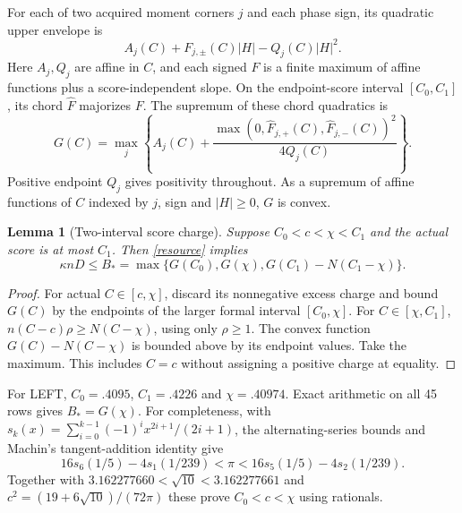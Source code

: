 \documentclass[11pt]{article}
\newtheorem{lemma}{Lemma}
\begin{document}
For each of two acquired moment corners $j$ and each phase sign, its
quadratic upper envelope is
\[
 A_j(C)+F_{j,\pm}(C)|H|-Q_j(C)|H|^2.
\]
Here $A_j,Q_j$ are affine in $C$, and each signed $F$ is a finite maximum
of affine functions plus a score-independent slope. On the endpoint-score
interval $[C_0,C_1]$, its chord $\widehat F$ majorizes $F$.
The supremum of these chord quadratics is
\[
 G(C)=\max_j\left\{A_j(C)+
 \frac{\max(0,\widehat F_{j,+}(C),\widehat F_{j,-}(C))^2}{4Q_j(C)}
 \right\}.
\]
Positive endpoint $Q_j$ gives positivity throughout. As a supremum of
affine functions of $C$ indexed by $j$, sign and $|H|\ge0$, $G$ is convex.

\begin{lemma}[Two-interval score charge]\label{charge}
Suppose $C_0<c<\chi<C_1$ and the actual score is at most $C_1$.
Then \eqref{resource} implies
\[
 \kappa nD\le
 B_*=\max\{G(C_0),G(\chi),G(C_1)-N(C_1-\chi)\}.
\]
\end{lemma}
\begin{proof}
For actual $C\in[c,\chi]$, discard its nonnegative excess charge and
bound $G(C)$ by the endpoints of the larger formal interval $[C_0,\chi]$.
For $C\in[\chi,C_1]$,
$n(C-c)\rho\ge N(C-\chi)$, using only $\rho\ge1$.
The convex function $G(C)-N(C-\chi)$ is bounded above by its endpoint
values. Take the maximum. This includes $C=c$ without assigning a
positive charge at equality.
\end{proof}

For LEFT, $C_0=.4095$, $C_1=.4226$ and $\chi=.40974$.
Exact arithmetic on all 45 rows gives $B_*=G(\chi)$.
For completeness, with
$s_k(x)=\sum_{i=0}^{k-1}(-1)^ix^{2i+1}/(2i+1)$, the alternating-series
bounds and Machin's tangent-addition identity give
\[
 16s_6(1/5)-4s_1(1/239)<\pi
 <16s_5(1/5)-4s_2(1/239).
\]
Together with $3.162277660<\sqrt{10}<3.162277661$ and
$c^2=(19+6\sqrt{10})/(72\pi)$ these prove $C_0<c<\chi$ using rationals.
\end{document}
